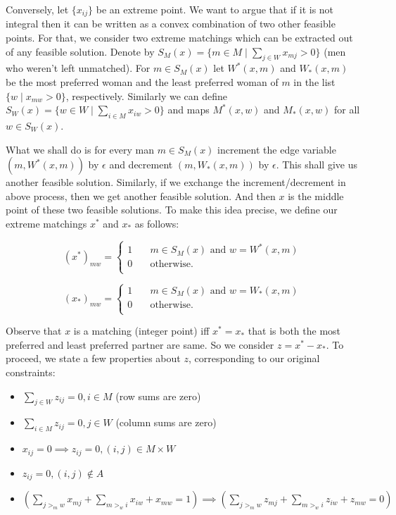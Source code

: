\documentclass[a4paper,UKenglish,cleveref, autoref]{lipics-v2019}
\theoremstyle{definition}
\begin{document}
Conversely, let $\{x_{ij}\}$ be an extreme point. We want to argue that if it is not integral then it can be written as a convex combination of two other feasible points. For that, we consider two extreme matchings which can be extracted out of any feasible solution. Denote by $S_M(x) = \{m \in M \mid \sum_{j \in W} x_{mj} > 0\}$ (men who weren't left unmatched). For $m \in S_M(x)$ let $W^*(x,m)$ and $W_*(x,m)$ be the most preferred woman and the least preferred woman of $m$ in the list $\{w \mid x_{mw} > 0\}$, respectively. Similarly we can define $S_W(x) = \{w \in W \mid \sum_{i \in M} x_{iw} > 0\}$ and maps $M^*(x,w)$ and $M_*(x,w)$ for all $w \in S_W(x)$.

What we shall do is for every man $m \in S_M(x)$ increment the edge variable $(m, W^*(x,m))$ by $\epsilon$ and decrement $(m, W_*(x,m))$ by $\epsilon$. This shall give us another feasible solution. Similarly, if we exchange the increment/decrement in above process, then we get another feasible solution. And then $x$ is the middle point of these two feasible solutions. To make this idea precise, we define our extreme matchings $x^*$ and $x_*$ as follows:

$$
(x^*)_{mw} =
     \begin{cases}
       1 &\quad m \in S_M(x) \text{ and } w=W^*(x,m) \\
       0 &\quad \text{otherwise.} \\
     \end{cases}
$$

$$
(x_*)_{mw} =
     \begin{cases}
       1 &\quad m \in S_M(x) \text{ and } w=W_*(x,m) \\
       0 &\quad \text{otherwise.} \\
     \end{cases}
$$

Observe that $x$ is a matching (integer point) iff $x^*=x_*$ that is both the most preferred and least preferred partner are same. So we consider $z = x^* - x_*$. To proceed, we state a few properties about $z$, corresponding to our original constraints:

\begin{itemize}
    \item $\sum_{j \in W} z_{ij} = 0, i \in M$ (row sums are zero)
    \item $\sum_{i \in M} z_{ij} = 0, j \in W$ (column sums are zero)
    \item $x_{ij} = 0 \implies z_{ij} = 0, (i,j) \in M \times W$
    \item $z_{ij} = 0, (i,j) \not \in A$
    \item $\left(\sum_{j >_m w} x_{mj} + \sum_{m >_ w i} x_{iw} + x_{mw} = 1 \right) \implies \left(\sum_{j >_m w} z_{mj} + \sum_{m >_ w i} z_{iw} + z_{mw} = 0\right)$
\end{itemize}
\end{document}
